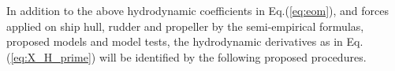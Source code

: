 \noindent In addition to the above hydrodynamic coefficients in Eq.(\ref{eq:eom}), and forces applied on ship hull, rudder and propeller by the semi-empirical formulas, proposed models and model tests, the hydrodynamic derivatives as in Eq.(\ref{eq:X_H_prime}) will be identified by the following proposed procedures.